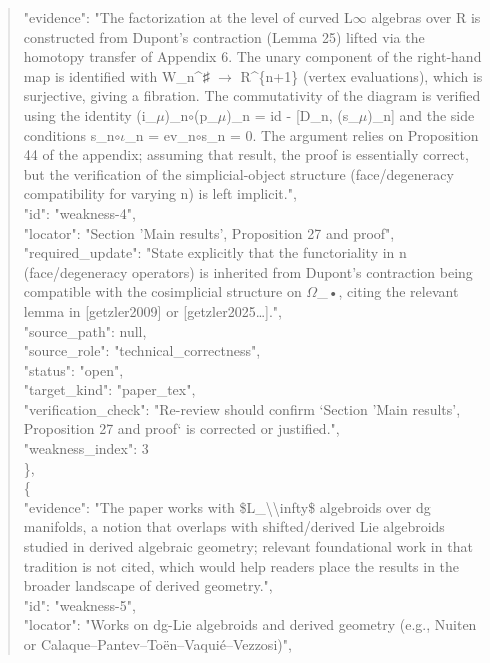 \documentclass[11pt]{article}
\begin{document}
\begin{quote}
      "evidence": "The factorization at the level of curved L\ensuremath{\infty} algebras over R is constructed from Dupont's contraction (Lemma 25) lifted via the homotopy transfer of Appendix 6. The unary component of the right-hand map is identified with W\_n\^{}♯ \ensuremath{\to} R\^{}\{n+1\} (vertex evaluations), which is surjective, giving a fibration. The commutativity of the diagram is verified using the identity (i\_\ensuremath{\mu})\_n\ensuremath{\circ}(p\_\ensuremath{\mu})\_n = id - [D\_n, (s\_\ensuremath{\mu})\_n] and the side conditions s\_n\ensuremath{\circ}\ensuremath{\iota}\_n = ev\_n\ensuremath{\circ}s\_n = 0. The argument relies on Proposition 44 of the appendix; assuming that result, the proof is essentially correct, but the verification of the simplicial-object structure (face/degeneracy compatibility for varying n) is left implicit.",\\
      "id": "weakness-4",\\
      "locator": "Section 'Main results', Proposition 27 and proof",\\
      "required\_update": "State explicitly that the functoriality in n (face/degeneracy operators) is inherited from Dupont's contraction being compatible with the cosimplicial structure on \ensuremath{\Omega}\_•, citing the relevant lemma in [getzler2009] or [getzler2025…].",\\
      "source\_path": null,\\
      "source\_role": "technical\_correctness",\\
      "status": "open",\\
      "target\_kind": "paper\_tex",\\
      "verification\_check": "Re-review should confirm `Section 'Main results', Proposition 27 and proof` is corrected or justified.",\\
      "weakness\_index": 3\\
    \},\\
    \{\\
      "evidence": "The paper works with \$L\_\textbackslash{}\textbackslash{}infty\$ algebroids over dg manifolds, a notion that overlaps with shifted/derived Lie algebroids studied in derived algebraic geometry; relevant foundational work in that tradition is not cited, which would help readers place the results in the broader landscape of derived geometry.",\\
      "id": "weakness-5",\\
      "locator": "Works on dg-Lie algebroids and derived geometry (e.g., Nuiten or Calaque--Pantev--Toën--Vaquié--Vezzosi)",\\

\end{quote}
\end{document}
